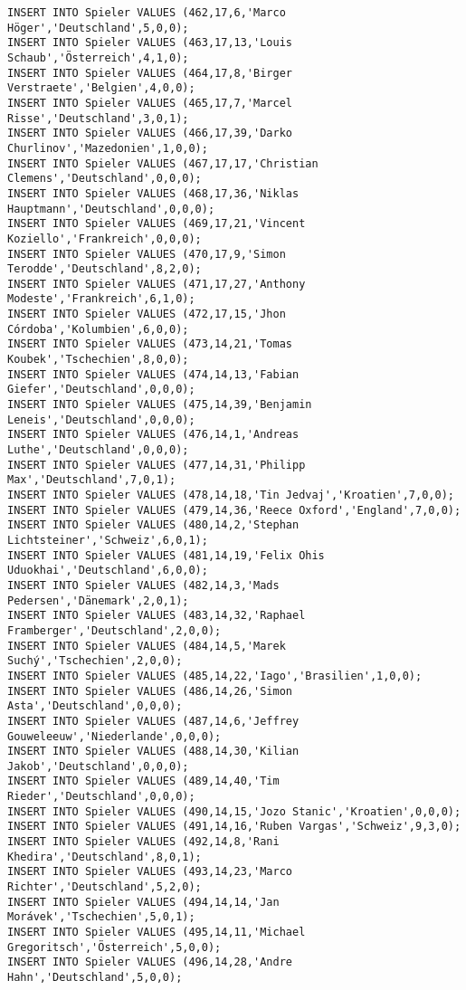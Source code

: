 \documentclass{lehramt-informatik-aufgabe}
\begin{document}
\begin{verbatim}
INSERT INTO Spieler VALUES (462,17,6,'Marco Höger','Deutschland',5,0,0);
INSERT INTO Spieler VALUES (463,17,13,'Louis Schaub','Österreich',4,1,0);
INSERT INTO Spieler VALUES (464,17,8,'Birger Verstraete','Belgien',4,0,0);
INSERT INTO Spieler VALUES (465,17,7,'Marcel Risse','Deutschland',3,0,1);
INSERT INTO Spieler VALUES (466,17,39,'Darko Churlinov','Mazedonien',1,0,0);
INSERT INTO Spieler VALUES (467,17,17,'Christian Clemens','Deutschland',0,0,0);
INSERT INTO Spieler VALUES (468,17,36,'Niklas Hauptmann','Deutschland',0,0,0);
INSERT INTO Spieler VALUES (469,17,21,'Vincent Koziello','Frankreich',0,0,0);
INSERT INTO Spieler VALUES (470,17,9,'Simon Terodde','Deutschland',8,2,0);
INSERT INTO Spieler VALUES (471,17,27,'Anthony Modeste','Frankreich',6,1,0);
INSERT INTO Spieler VALUES (472,17,15,'Jhon Córdoba','Kolumbien',6,0,0);
INSERT INTO Spieler VALUES (473,14,21,'Tomas Koubek','Tschechien',8,0,0);
INSERT INTO Spieler VALUES (474,14,13,'Fabian Giefer','Deutschland',0,0,0);
INSERT INTO Spieler VALUES (475,14,39,'Benjamin Leneis','Deutschland',0,0,0);
INSERT INTO Spieler VALUES (476,14,1,'Andreas Luthe','Deutschland',0,0,0);
INSERT INTO Spieler VALUES (477,14,31,'Philipp Max','Deutschland',7,0,1);
INSERT INTO Spieler VALUES (478,14,18,'Tin Jedvaj','Kroatien',7,0,0);
INSERT INTO Spieler VALUES (479,14,36,'Reece Oxford','England',7,0,0);
INSERT INTO Spieler VALUES (480,14,2,'Stephan Lichtsteiner','Schweiz',6,0,1);
INSERT INTO Spieler VALUES (481,14,19,'Felix Ohis Uduokhai','Deutschland',6,0,0);
INSERT INTO Spieler VALUES (482,14,3,'Mads Pedersen','Dänemark',2,0,1);
INSERT INTO Spieler VALUES (483,14,32,'Raphael Framberger','Deutschland',2,0,0);
INSERT INTO Spieler VALUES (484,14,5,'Marek Suchý','Tschechien',2,0,0);
INSERT INTO Spieler VALUES (485,14,22,'Iago','Brasilien',1,0,0);
INSERT INTO Spieler VALUES (486,14,26,'Simon Asta','Deutschland',0,0,0);
INSERT INTO Spieler VALUES (487,14,6,'Jeffrey Gouweleeuw','Niederlande',0,0,0);
INSERT INTO Spieler VALUES (488,14,30,'Kilian Jakob','Deutschland',0,0,0);
INSERT INTO Spieler VALUES (489,14,40,'Tim Rieder','Deutschland',0,0,0);
INSERT INTO Spieler VALUES (490,14,15,'Jozo Stanic','Kroatien',0,0,0);
INSERT INTO Spieler VALUES (491,14,16,'Ruben Vargas','Schweiz',9,3,0);
INSERT INTO Spieler VALUES (492,14,8,'Rani Khedira','Deutschland',8,0,1);
INSERT INTO Spieler VALUES (493,14,23,'Marco Richter','Deutschland',5,2,0);
INSERT INTO Spieler VALUES (494,14,14,'Jan Morávek','Tschechien',5,0,1);
INSERT INTO Spieler VALUES (495,14,11,'Michael Gregoritsch','Österreich',5,0,0);
INSERT INTO Spieler VALUES (496,14,28,'Andre Hahn','Deutschland',5,0,0);

\end{verbatim}
\end{document}
